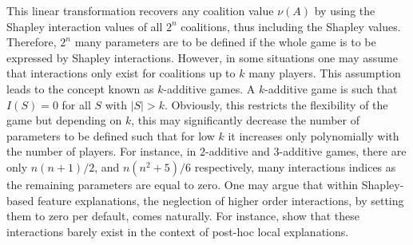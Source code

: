 This linear transformation recovers any coalition value $\nu(A)$ by using the Shapley interaction values of all $2^n$ coalitions, thus including the Shapley values.
Therefore, $2^n$ many parameters are to be defined if the whole game is to be expressed by Shapley interactions.
However, in some situations one may assume that interactions only exist for coalitions up to $k$ many players. This assumption leads to the concept known as $k$-additive games.
A $k$-additive game is such that $I(S) = 0$ for all $S$ with $\left| S \right| > k$.
Obviously, this restricts the flexibility of the game but depending on $k$, this may significantly decrease the number of parameters to be defined such that for low $k$ it increases only polynomially with the number of players. 
For instance, in $2$-additive and $3$-additive games, there are only $n(n+1)/2$, and $n(n^2+5)/6$ respectively, many interactions indices as the remaining parameters are equal to zero.
One may argue that within Shapley-based feature explanations, the neglection of higher order interactions, by setting them to zero per default, comes naturally.
For instance, \citet{Bordt.2023} show that these interactions barely exist in the context of post-hoc local explanations.